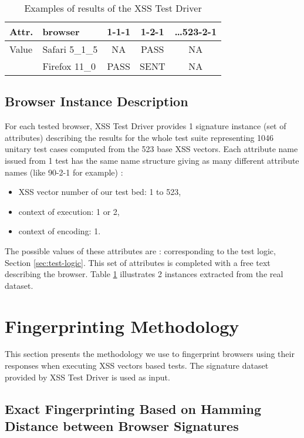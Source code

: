 \documentclass[10pt]{IEEEtran}
\begin{document}
\begin{table}\center
\caption{Examples of results of the XSS Test Driver\label{rawinstance}}
\begin{tabular}{l|l|c|c|c}
\hline
Attr. & browser  & 1-1-1 &  1-2-1 & \ldots523-2-1 \\
\hline
Value & Safari 5\_1\_5 & NA &  PASS  & NA  \\
\cline{2-5}
         & Firefox 11\_0 &  PASS & SENT  & NA  \\      
\hline
\end{tabular}
\label{tab:instance-example}
\end{table}
\subsection{Browser Instance Description}
For each tested browser, XSS Test Driver provides 1 signature instance (set of attributes) 
describing the results for the whole test suite 
representing 1046 unitary test cases computed from the 523 base XSS vectors. 
Each attribute name issued from 1 test has the same name
structure giving as many different attribute names (like 90-2-1 for example) :
\begin{itemize}
        \item XSS vector number of our test bed: 1 to 523,
        \item context of execution: 1 or 2,
        \item context of encoding: 1.
\end{itemize}
The possible values of these attributes are :  corresponding to the test logic,  
Section \ref{sec:test-logic}.
This set of attributes is completed with a free text describing the browser. 
Table \ref{tab:instance-example} illustrates 2 instances extracted from the real dataset.




\section{Fingerprinting Methodology}
\label{sec:fingerprinting-methodology}
This section presents the methodology we use to fingerprint browsers using their responses 
 when executing XSS vectors based tests. The signature dataset provided by XSS Test Driver is used as input.




\subsection{Exact Fingerprinting Based on Hamming Distance between Browser Signatures}
\label{sec:method-exact-fingerprinting}
\end{document}
